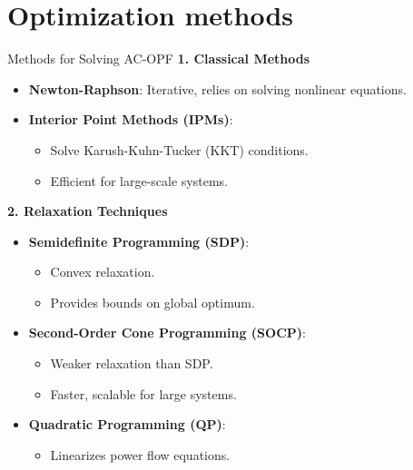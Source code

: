 \documentclass[11pt, aspectratio=169]{beamer}
\begin{document}
\section{Optimization methods}
\begin{frame}{Methods for Solving AC-OPF}
    \textbf{1. Classical Methods}
    \begin{itemize}
        \item \textbf{Newton-Raphson}: Iterative, relies on solving nonlinear equations.
        \item \textbf{Interior Point Methods (IPMs)}:
        \begin{itemize}
            \item Solve Karush-Kuhn-Tucker (KKT) conditions.
            \item Efficient for large-scale systems.
        \end{itemize}
    \end{itemize}
    
    \textbf{2. Relaxation Techniques}
    \begin{itemize}
        \item \textbf{Semidefinite Programming (SDP)}:
        \begin{itemize}
            \item Convex relaxation.
            \item Provides bounds on global optimum.
        \end{itemize}
        \item \textbf{Second-Order Cone Programming (SOCP)}:
        \begin{itemize}
            \item Weaker relaxation than SDP.
            \item Faster, scalable for large systems.
        \end{itemize}
        \item \textbf{Quadratic Programming (QP)}:
        \begin{itemize}
            \item Linearizes power flow equations.
        \end{itemize}
    \end{itemize}
\end{frame}
\end{document}
